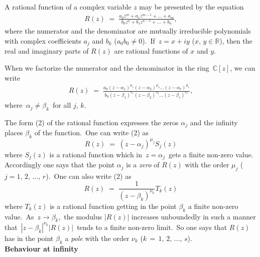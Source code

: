 \documentclass[12pt]{article}
\theoremstyle{definition}
\begin{document}

A rational function of a complex variable $z$ may be presented by the equation
\begin{align}
R(z) \;=\; 
\frac{a_0z^m+a_1z^{m-1}+\ldots+a_m}{b_0z^n+b_1z^{n-1}+\ldots+b_n},
\end{align}
where the numerator and the denominator are mutually irreducible polynomials with complex coefficients $a_j$ and $b_k$ ($a_0b_0\neq 0$).\, If\, $z = x\!+\!iy$ 
($x,\,y\in\mathbb{R}$), then the real and imaginary parts of $R(z)$ are rational functions of $x$ and $y$.

When we factorize the numerator and the denominator in the ring\, $\mathbb{C}[z]$, we can write 
\begin{align}
R(z) \;=\; 
\frac{a_0(z-\alpha_1)^{\mu_1}(z-\alpha_2)^{\mu_2}\ldots(z-\alpha_r)^{\mu_r}} {b_0(z-\beta_1)^{\nu_1}(z-\beta_2)^{\nu_2}\ldots(z-\beta_s)^{\nu_s}},
\end{align}
where\, $\alpha_j \neq \beta_k$\, for all $j,\,k$.

The form (2) of the rational function expresses the zeros $\alpha_j$ and the infinity places $\beta_k$ of the function.\, One can write (2) as
$$R(z) \;=\; (z\!-\!\alpha_j)^{\mu_j}S_j(z)$$
where $S_j(z)$ is a rational function which in\, $z = \alpha_j$\, gets a finite non-zero value.\, Accordingly one says that the point $\alpha_j$ is a {\em zero} of  $R(z)$ with the order $\mu_j$ ($j = 1,\,2,\,\ldots,\,r$).\, One can also write (2) as
$$R(z) \;=\; \frac{1}{(z\!-\!\beta_k)^{\nu_k}}T_k(z)$$
where $T_k(z)$ is a rational function getting in the point $\beta_k$ a finite non-zero value.\, 
As\, $z\to\beta_k$,\, the modulus $|R(z)|$ increases unboundedly in such a manner that\, $|z-\beta_k|^{\nu_k}|R(z)|$\, tends to a finite non-zero limit.\, So one says that $R(z)$ has in the point $\beta_k$ a {\em pole} with the order $\nu_k$ ($k \,=\, 1,\,2,\,\ldots,\,s$).\\

\textbf{Behaviour at infinity}
\end{document}

